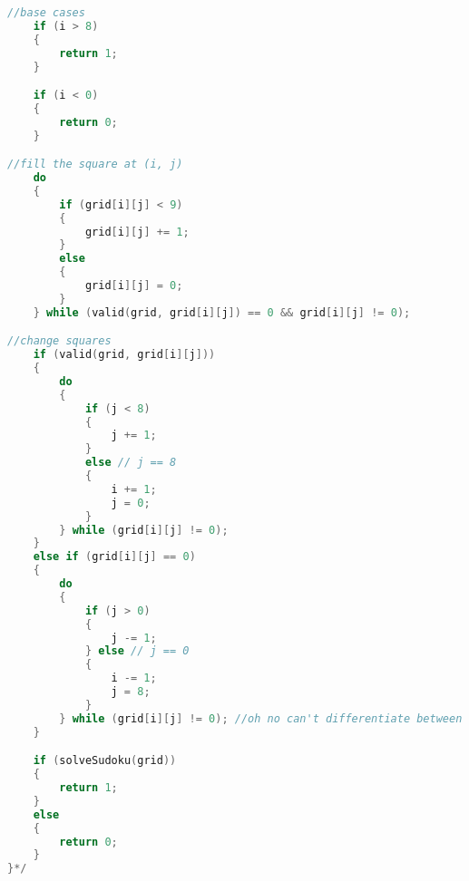 \documentclass{article}
\begin{document}
\begin{lstlisting}[language=C, caption=Sudoku Solver.c]
//base cases
    if (i > 8)
    {
        return 1;
    }

    if (i < 0)
    {
        return 0;
    }

//fill the square at (i, j)
    do
    {
        if (grid[i][j] < 9)
        {
            grid[i][j] += 1;
        }
        else
        {
            grid[i][j] = 0;
        }
    } while (valid(grid, grid[i][j]) == 0 && grid[i][j] != 0);

//change squares
    if (valid(grid, grid[i][j]))
    {
        do
        {
            if (j < 8)
            {
                j += 1;
            }
            else // j == 8
            {
                i += 1;
                j = 0;
            }
        } while (grid[i][j] != 0);
    }
    else if (grid[i][j] == 0)
    {
        do
        {
            if (j > 0)
            {
                j -= 1;
            } else // j == 0
            {
                i -= 1;
                j = 8;
            }
        } while (grid[i][j] != 0); //oh no can't differentiate between puzzle and entry
    }

    if (solveSudoku(grid))
    {
        return 1;
    }
    else
    {
        return 0;
    }
}*/

\end{lstlisting}
\end{document}

